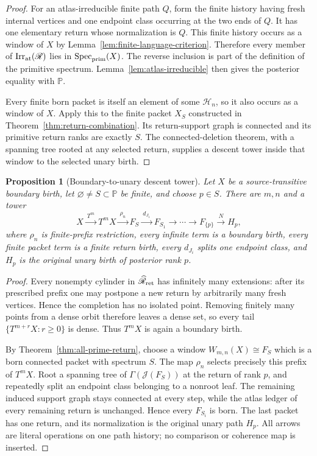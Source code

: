 \documentclass[11pt]{article}
\newtheorem{proposition}[theorem]{Proposition}
\begin{document}
\begin{proof}
For an atlas-irreducible finite path \(Q\), form the finite history having
fresh internal vertices and one endpoint class occurring at the two ends of
\(Q\).  It has one elementary return whose normalization is \(Q\).  This
finite history occurs as a window of \(X\) by
Lemma~\ref{lem:finite-language-criterion}.  Therefore every member of
\(\operatorname{Irr}_{\rm at}(\mathscr R)\) lies in
\(\operatorname{Spec}_{\rm prim}(X)\).  The reverse inclusion is part of the
definition of the primitive spectrum.  Lemma~\ref{lem:atlas-irreducible}
then gives the posterior equality with \(\mathbb P\).

Every finite born packet is itself an element of some \(\mathscr H_n\), so it
also occurs as a window of \(X\).  Apply this to the finite packet \(X_S\)
constructed in Theorem~\ref{thm:return-combination}.  Its return-support
graph is connected and its primitive return ranks are exactly \(S\).
The connected-deletion theorem, with a spanning tree rooted at any selected
return, supplies a descent tower inside that window to the selected unary
birth.
\end{proof}

\begin{proposition}[Boundary-to-unary descent tower]
\label{prop:boundary-unary-descent}
Let \(X\) be a source-transitive boundary birth, let
\(\varnothing\ne S\subset\mathbb P\) be finite, and choose \(p\in S\).
There are \(m,n\) and a tower
\[
X
\xrightarrow{\ T^m\ }
T^mX
\xrightarrow{\ \rho_n\ }
F_S
\xrightarrow{\ d_{J_1}\ }
F_{S_1}
\longrightarrow\cdots\longrightarrow
F_{\{p\}}
\xrightarrow{\ N\ }
H_p,
\]
where \(\rho_n\) is finite-prefix restriction, every infinite term is a
boundary birth, every finite packet term is a finite return birth, every
\(d_{J_i}\) splits one endpoint class, and \(H_p\) is the original unary
birth of posterior rank \(p\).
\end{proposition}

\begin{proof}
Every nonempty cylinder in \(\widehat{\mathscr R}_{\rm ret}\) has infinitely
many extensions: after its prescribed prefix one may postpone a new return by
arbitrarily many fresh vertices.  Hence the completion has no isolated point.
Removing finitely many points from a dense orbit therefore leaves a dense
set, so every tail \(\{T^{m+r}X:r\ge0\}\) is dense.  Thus \(T^mX\) is again a
boundary birth.

By Theorem~\ref{thm:all-prime-return}, choose a window
\(W_{m,n}(X)\cong F_S\) which is a born connected packet with spectrum \(S\).
The map \(\rho_n\) selects precisely this prefix of \(T^mX\).  Root a spanning
tree of \(\Gamma(\mathcal J(F_S))\) at the return of rank \(p\), and repeatedly
split an endpoint class belonging to a nonroot leaf.  The remaining induced
support graph stays connected at every step, while the atlas ledger of every
remaining return is unchanged.  Hence every \(F_{S_i}\) is born.  The last
packet has one return, and its normalization is the original unary path
\(H_p\).  All arrows are literal operations on one path history; no comparison
or coherence map is inserted.
\end{proof}
\end{document}
